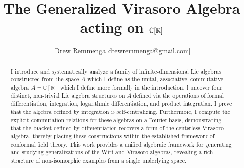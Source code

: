 \documentclass{artjlt}
\title{The Generalized Virasoro Algebra acting on $\C[\R]$}
\author{[Drew Remmenga drewremmenga@gmail.com]}
\newcommand{\?}{\textbackslash}
\newcommand{\C}{\mathbb{C}}
\newcommand{\R}{\mathbb{R}}
\begin{document}
\nocite{*}

\maketitle
\begin{abstract}
I introduce and systematically analyze a family of infinite-dimensional Lie algebras constructed from the space $A$ which I define as the unital, associative, commutative algebra $A=\C[\R]$ which I define more formally in the introduction. 
I uncover four distinct, non-trivial Lie algebra structures on $A$ defined via the operations of formal differentiation, integration, logarithmic differentiation, and product integration. 
I prove that the algebra defined by integration is self-centralizing. Furthermore, I compute the explicit commutation relations for these algebras on a Fourier basis, demonstrating that the bracket defined by differentiation recovers a form of the centerless Virasoro algebra, thereby placing these constructions within the established framework of conformal field theory. This work provides a unified algebraic framework for generating and studying generalizations of the Witt and Virasoro algebras, revealing a rich structure of non-isomorphic examples from a single underlying space.
\end{abstract}
\end{document}

